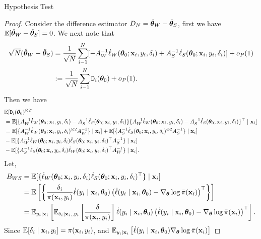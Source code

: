 \documentclass[12pt,hidelinks]{article}
\begin{document}
\begin{section}{Hypothesis Test}
\begin{proof}
Consider the difference estimator $D_N = {\hat{\bm{\theta}}}_W - {\hat{\bm{\theta}}}_S$, first we have $\mathbb{E}[{\hat{\bm{\theta}}}_W - {\hat{\bm{\theta}}}_S] = 0$.
We next note that 
\begin{align*}
    \sqrt{N} ({\hat{\bm{\theta}}}_W - {\hat{\bm{\theta}}}_S) &= \frac{1}{\sqrt{N}} \sum_{i-1}^{N} [-A_W^{-1} \dot \ell_W(\bm{\theta}_0; \mathbf{x}_i, y_i, \delta_i) + A_S^{-1} \dot \ell_S(\bm{\theta}_0; \mathbf{x}_i, y_i, \delta_i)] +o_{P}(1) \\
    & := \frac{1}{\sqrt{N}} \sum_{i-1}^{N} \mathtt{D}_i(\bm{\theta}_0) + o_{P}(1).
\end{align*}
Then we have 
\begin{align}
   & \mathbb{E}[\mathtt{D}_i(\bm{\theta}_0) ^{\otimes 2}] \notag \\
   &= \mathbb{E}[ \{A_W^{-1} \dot \ell_W (\bm{\theta}_0; \mathbf{x}_i, y_i, \delta_i) - A_S^{-1} \dot \ell_S (\bm{\theta}_0; \mathbf{x}_i, y_i, \delta_i)\} \{A_W^{-1} \dot \ell_W (\bm{\theta}_0; \mathbf{x}_i, y_i, \delta_i) - A_S^{-1} \dot \ell_S (\bm{\theta}_0; \mathbf{x}_i, y_i, \delta_i)\}^\top  \mid \mathbf{x}_i] \notag \\
   &= \mathbb{E}[\{A_W^{-1} \dot \ell_W (\bm{\theta}_0; \mathbf{x}_i, y_i, \delta_i)^{\otimes 2} A_W^{-1} \} \mid \mathbf{x}_i] + \mathbb{E}[\{ A_S^{-1} \dot \ell_S (\bm{\theta}_0; \mathbf{x}_i, y_i, \delta_i)^{\otimes 2} A_S^{-1} \} \mid \mathbf{x}_i] \notag \\
   &- \mathbb{E}[\{ A_W^{-1} \dot \ell_W (\bm{\theta}_0; \mathbf{x}_i, y_i, \delta_i) \dot \ell_S (\bm{\theta}_0; \mathbf{x}_i, y_i, \delta_i)^\top A_S^{-1} \} \mid \mathbf{x}_i] \notag \\
   &- \mathbb{E}[\{ A_S^{-1} \dot \ell_S (\bm{\theta}_0; \mathbf{x}_i, y_i, \delta_i) \dot \ell_W (\bm{\theta}_0; \mathbf{x}_i, y_i, \delta_i)^\top A_W^{-1} \} \mid \mathbf{x}_i].
\end{align}
Let, 
\begin{align}
    \notag
    B_{WS} &= \mathbb{E} [\{ \dot \ell_W (\bm{\theta}_0; \mathbf{x}_i, y_i, \delta_i) \dot \ell_S (\bm{\theta}_0; \mathbf{x}_i, y_i, \delta_i)^\top \}\mid \mathbf{x}_i] \notag \\
    &= \mathbb{E} \left[\left\{ \frac{\delta_i}{\pi(\mathbf{x}_i,y_i)} \dot \ell(y_i\mid \mathbf{x}_i,\bm{\theta}_0) \left( \dot \ell(y_i\mid \mathbf{x}_i,\bm{\theta}_0) - \nabla_{\bm{\theta}} \log \bar{\pi}(\mathbf{x}_i)  \right)^\top \right\} \right] \notag \\ 
    &= \mathbb{E}_{y_i\mid \mathbf{x}_i} \left[ \mathbb{E}_{\delta_i \mid \mathbf{x}_i,,y_i}  \left[ \frac{\delta}{\pi(\mathbf{x}_i, y_i)} \right] \dot \ell(y_i\mid \mathbf{x}_i,\bm{\theta}_0) \left( \dot \ell(y_i\mid \mathbf{x}_i,\bm{\theta}_0) - \nabla_{\bm{\theta}} \log \bar{\pi}(\mathbf{x}_i)  \right)^\top \right]. 
\end{align}
Since $\mathbb{E}[\delta_i \mid \mathbf{x}_i,y_i] = \pi(\mathbf{x}_i,y_i)$, and $\mathbb{E}_{y_i\mid \mathbf{x}_i} \left[\dot \ell(y_i\mid \mathbf{x}_i,\bm{\theta}_0) \nabla_{\bm{\theta}} \log \bar{\pi}(\mathbf{x}_i) \right]$

\end{proof}
\end{section}
\end{document}
